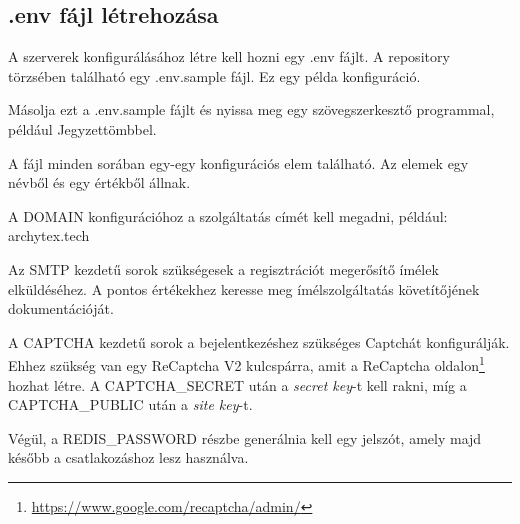\subsection{.env fájl létrehozása}
\label{config}

A szerverek konfigurálásához létre kell hozni egy .env fájlt. A repository törzsében található egy .env.sample fájl. Ez egy példa konfiguráció.

Másolja ezt a .env.sample fájlt és nyissa meg egy szövegszerkesztő programmal, például Jegyzettömbbel.

A fájl minden sorában egy-egy konfigurációs elem található. Az elemek egy névből és egy értékből állnak.

A DOMAIN konfigurációhoz a szolgáltatás címét kell megadni, például: archytex.tech

Az SMTP kezdetű sorok szükségesek a regisztrációt megerősítő ímélek elküldéséhez. A pontos értékekhez keresse meg ímélszolgáltatás követítőjének dokumentációját.

A CAPTCHA kezdetű sorok a bejelentkezéshez szükséges Captchát konfigurálják. Ehhez szükség van egy ReCaptcha V2 kulcspárra, amit a ReCaptcha oldalon\footnote{\url{https://www.google.com/recaptcha/admin/}} hozhat létre. A CAPTCHA\_SECRET után a \emph{secret key}-t kell rakni, míg a CAPTCHA\_PUBLIC után a \emph{site key}-t.

Végül, a REDIS\_PASSWORD részbe generálnia kell egy jelszót, amely majd később a csatlakozáshoz lesz használva.